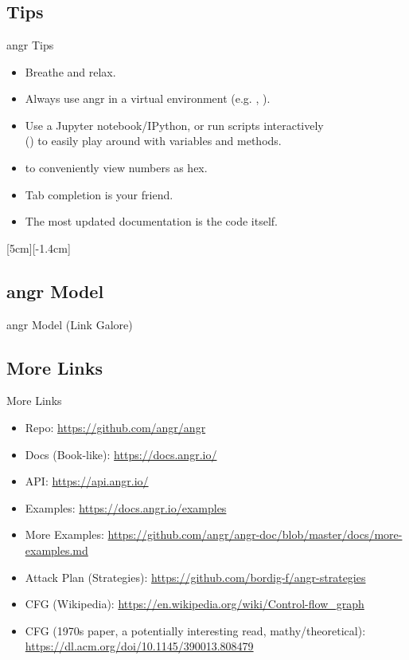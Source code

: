\documentclass[xcolor={dvipsnames}]{beamer}
\begin{document}
\appendix
\section{\appendixname}
\frame{\tableofcontents}
\subsection{Tips}
\begin{frame}[fragile]{angr Tips}\label{tips}
    \begin{itemize}
        \item Breathe and relax.
        \item Always use angr in a virtual environment (e.g. , ).
        \item Use a Jupyter notebook/IPython, or run scripts interactively \\() to easily play around with variables and methods.
        \item {} to conveniently view numbers as hex.
        \item Tab completion is your friend.
        \item The most updated documentation is the code itself.
    \end{itemize}
    [5cm][-1.4cm]
\end{frame}
\subsection{angr Model}
\begin{frame}{angr Model (Link Galore)}
\end{frame}
\subsection{More Links}
\begin{frame}{More Links}
    \footnotesize
    \begin{itemize}
        \item Repo: \url{https://github.com/angr/angr}
        \item Docs (Book-like): \url{https://docs.angr.io/}
        \item API: \url{https://api.angr.io/}
        \item Examples: \url{https://docs.angr.io/examples}
        \item More Examples: \url{https://github.com/angr/angr-doc/blob/master/docs/more-examples.md}
        \item Attack Plan (Strategies): \url{https://github.com/bordig-f/angr-strategies}
        \item CFG (Wikipedia): \url{https://en.wikipedia.org/wiki/Control-flow_graph}
        \item CFG (1970s paper, a potentially interesting read, mathy/theoretical):
              \url{https://dl.acm.org/doi/10.1145/390013.808479}
    \end{itemize}
\end{frame}
\end{document}
